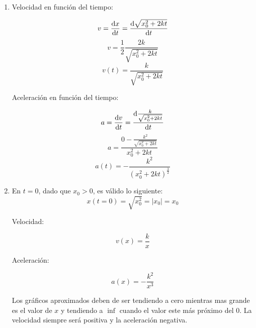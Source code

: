 \begin{enumerate}

\item

	Velocidad en funci\'on del tiempo:

	$$ v = \dv{x}{t} = \dv{\sqrt{x_0^2+2kt}}{t} $$
	$$ v = \frac{1}{2}\frac{2k}{\sqrt{x_0^2+2kt} }$$
	$$ v(t) = \frac{k}{\sqrt{x_0^2+2kt}} $$
	
	Aceleraci\'on en funci\'on del tiempo:
	
	$$ a = \dv{v}{t} = \dv{\frac{k}{\sqrt{x_0^2+2kt}}}{t} $$
	$$ a = \frac{0 - \frac{k^2}{\sqrt{x_0^2+2kt}}}{x_0^2+2kt} $$
	$$ a(t) = -\frac{k^2}{(x_0^2+2kt)^\frac{3}{2}} $$
	
\item
	
	En $t = 0$, dado que $x_0 > 0$, es v\'alido lo siguiente:
	$$ x(t = 0) = \sqrt{x_0^2} = \left| x_0 \right| = x_0 $$
	
	Velocidad:
	
	$$ v(x) = \frac{k}{x}$$
	
	Aceleraci\'on:
	
	$$ a(x) = -\frac{k^2}{x^3}$$
	
	Los gr\'aficos aproximados deben de ser tendiendo a cero mientras mas grande es el valor de $x$ y tendiendo a $\inf$ cuando el valor este m\'as pr\'oximo del $0$. La velocidad siempre ser\'a positiva y la aceleraci\'on negativa. 

\end{enumerate}